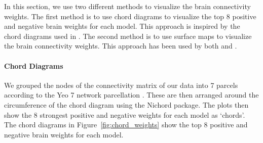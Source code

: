 In this section, we use two different methods to visualize the brain connectivity weights.
The first method is to use chord diagrams to visualize the top 8 positive and negative brain \gls{weights} for each model.
This approach is inspired by the chord diagrams used in \cite{smith2015positive}.
The second method is to use surface maps to visualize the brain connectivity weights.
This approach has been used by both \cite{ferreira2022hierarchical} and \cite{smith2015positive}.

\paragraph{Chord Diagrams}
We grouped the nodes of the connectivity matrix of our data into 7 parcels according to the Yeo 7 network parcellation \cite{yeo2011organization}.
These are then arranged around the circumference of the chord diagram using the Nichord package\citep{bogdan2023connsearch}.
The plots then show the 8 strongest positive and negative \gls{weights} for each model as `chords'.
The chord diagrams in Figure~\ref{fig:chord_weights} show the top 8 positive and negative brain \gls{weights} for each model.

